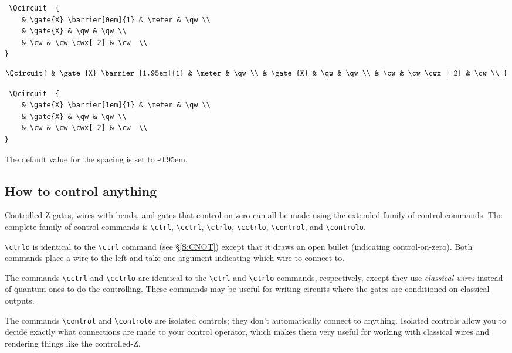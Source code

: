 \documentclass[twocolumn,nofootinbib]{revtex4}
\begin{document}
{\small \begin{verbatim} \Qcircuit  {
    & \gate{X} \barrier[0em]{1} & \meter & \qw \\
    & \gate{X} & \qw & \qw \\
    & \cw & \cw \cwx[-2] & \cw  \\
}\end{verbatim}}

\[ \Qcircuit {
    & \gate{X} \barrier[1.95em]{1} & \meter & \qw \\
    & \gate{X} & \qw & \qw \\
    & \cw & \cw \cwx[-2] & \cw \\
}\]

{\small \begin{verbatim} \Qcircuit  {
    & \gate{X} \barrier[1em]{1} & \meter & \qw \\
    & \gate{X} & \qw & \qw \\
    & \cw & \cw \cwx[-2] & \cw  \\
}\end{verbatim}}

The default value for the spacing is set to -0.95em.

\subsection{How to control anything}

Controlled-Z gates, wires with bends, and gates that control-on-zero can all be made using the extended family of control commands.  The complete family of control commands is \verb=\ctrl=, \verb=\cctrl=, \verb=\ctrlo=, \verb=\cctrlo=, \verb=\control=, and \verb=\controlo=.

\verb=\ctrlo= is identical to the \verb=\ctrl= command (see \S\ref{S:CNOT}) except that it draws an open bullet (indicating control-on-zero).  Both commands place a wire to the left and take one argument indicating which wire to connect to.

The commands \verb=\cctrl= and \verb=\cctrlo= are identical to the \verb=\ctrl= and \verb=\ctrlo= commands, respectively, except they use \emph{classical wires} instead of quantum ones to do the controlling. These commands may be useful for writing circuits where the gates are conditioned on classical outputs.

The commands \verb=\control= and \verb=\controlo= are isolated controls; they don't automatically connect to anything.  Isolated controls allow you to decide exactly what connections are made to your control operator, which makes them very useful for working with classical wires and rendering things like the controlled-Z.
\end{document}
